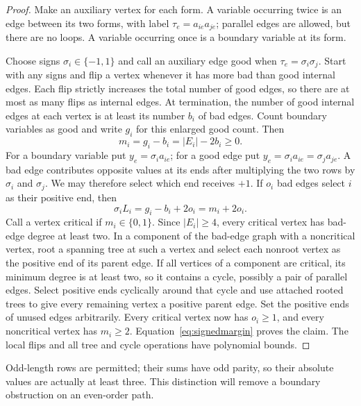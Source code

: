 \begin{proof}
Make an auxiliary vertex for each form. A variable occurring twice is an
edge between its two forms, with label $\tau_e=a_{ie}a_{je}$; parallel
edges are allowed, but there are no loops. A variable occurring once is
a boundary variable at its form.

Choose signs $\sigma_i\in\{-1,1\}$ and call an auxiliary edge good when
$\tau_e=\sigma_i\sigma_j$. Start with any signs and flip a vertex whenever
it has more bad than good internal edges. Each flip strictly increases
the total number of good edges, so there are at most as many flips as
internal edges. At termination, the number of good internal edges at
each vertex is at least its number $b_i$ of bad edges. Count boundary
variables as good and write $g_i$ for this enlarged good count. Then
\[
 m_i=g_i-b_i=|E_i|-2b_i\ge0.
\]
For a boundary variable put $y_e=\sigma_i a_{ie}$; for a good edge put
$y_e=\sigma_i a_{ie}=\sigma_j a_{je}$. A bad edge contributes opposite
values at its ends after multiplying the two rows by $\sigma_i$ and
$\sigma_j$. We may therefore select which end receives $+1$. If $o_i$
bad edges select $i$ as their positive end, then
\begin{equation}\label{eq:signedmargin}
 \sigma_i L_i=g_i-b_i+2o_i=m_i+2o_i.
\end{equation}
Call a vertex critical if $m_i\in\{0,1\}$. Since $|E_i|\ge4$, every
critical vertex has bad-edge degree at least two. In a component of the
bad-edge graph with a noncritical vertex, root a spanning tree at such
a vertex and select each nonroot vertex as the positive end of its
parent edge. If all vertices of a component are critical, its minimum
degree is at least two, so it contains a cycle, possibly a pair of
parallel edges. Select positive ends cyclically around that cycle and
use attached rooted trees to give every remaining vertex a positive
parent edge. Set the positive ends of unused edges arbitrarily.
Every critical vertex now has $o_i\ge1$, and every noncritical vertex
has $m_i\ge2$. Equation~\eqref{eq:signedmargin} proves the claim.
The local flips and all tree and cycle operations have polynomial bounds.
\end{proof}

Odd-length rows are permitted; their sums have odd parity, so their
absolute values are actually at least three. This distinction will
remove a boundary obstruction on an even-order path.

